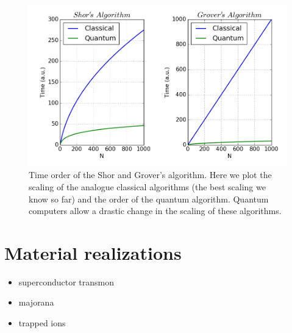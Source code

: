 \begin{figure}[!h]
  \centering
  \includegraphics{chapter02/figures/quantum_scaling.png}
  \vspace{-5pt}
  \caption{Time order of the Shor and Grover's algorithm. Here we plot the scaling of the analogue classical algorithms (the best scaling we know so far) and the order of the quantum algorithm. Quantum computers allow a drastic change in the scaling of these algorithms.}
\end{figure}
\FloatBarrier


\section{Material realizations}
\begin{itemize}
  \item superconductor transmon
  \item majorana
  \item trapped ions
\end{itemize}
